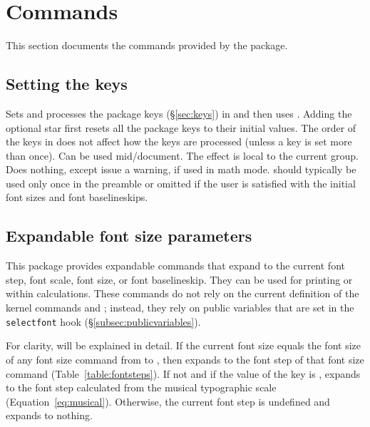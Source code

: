 \documentclass{beery}
\begin{document}
\section{Commands}
\label{sec:commands}

This section documents the commands provided by the  package.

\subsection{Setting the keys}
\label{subsec:fontscalesetup}

 \sarg{} 
\KeepNextPar*

Sets and processes the  package keys (\S\ref{sec:keys}) in  and then uses .
Adding the optional star first resets all the  package keys to their initial values.
The order of the keys in  does not affect how the keys are processed (unless a key is set more than once).
Can be used mid\-/document.
The effect is local to the current group.
Does nothing, except issue a warning, if used in math mode.
 should typically be used only once in the preamble or omitted if the user is satisfied with the initial font sizes and font baselineskips.

\subsection{Expandable font size parameters}
\label{subsec:expandable}

\nopagebreak\newline
{}
\newline
{}
\nopagebreak\newline
{}

This package provides expandable commands that expand to the current font step, font scale, font size, or font baselineskip.
They can be used for printing or within calculations.
These commands do not rely on the current definition of the kernel commands  and ; instead, they rely on public  variables that are set in the \texttt{selectfont} hook (\S\ref{subsec:publicvariables}).

For clarity,  will be explained in detail.
If the current font size equals the font size of any font size command from  to , then  expands to the font step of that font size command (Table~\ref{table:fontsteps}).
If not and if the value of the key  is ,  expands to the font step calculated from the musical typographic scale (Equation~\ref{eq:musical}).
Otherwise, the current font step is undefined and  expands to nothing.
\end{document}

